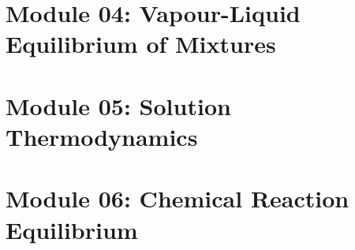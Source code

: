 \documentclass[12pts,a4paper,amsmath,amssymb,floatfix]{article}%
\begin{document}
\clearpage

\section{Module 04: Vapour-Liquid Equilibrium of Mixtures}\label{Section:04}

\clearpage

\section{Module 05: Solution Thermodynamics}\label{Section:05}

\clearpage

\section{Module 06: Chemical Reaction Equilibrium}\label{Section:06}

\clearpage


\end{document}
